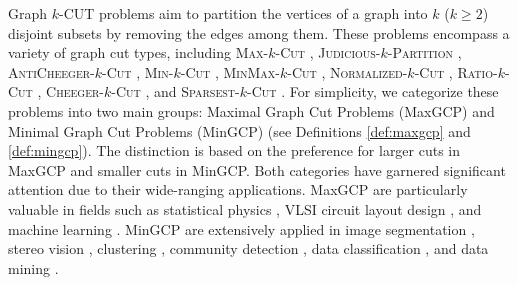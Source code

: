 \documentclass[12pt, a4paper]{article}%
\numberwithin{equation}{section}
\theoremstyle{plain}
\begin{document}
	Graph $k$-CUT problems aim to partition the vertices of a graph into $k$ ($k \geq 2$) disjoint subsets by removing the edges among them. These problems encompass a variety of graph cut types, including \textsc{Max}-$k$-\textsc{Cut} \cite{kann1997hardness}, \textsc{Judicious}-$k$-\textsc{Partition} \cite{bollobas2002problems}, \textsc{AntiCheeger}-$k$-\textsc{Cut} \cite{xu2016graph}, \textsc{Min}-$k$-\textsc{Cut} \cite{goldschmidt1994polynomial}, \textsc{MinMax}-$k$-\textsc{Cut} \cite{chandrasekaran2023fixed}, \textsc{Normalized}-$k$-\textsc{Cut} \cite{shi2000normalized}, \textsc{Ratio}-$k$-\textsc{Cut} \cite{dhillon2007weighted}, \textsc{Cheeger}-$k$-\textsc{Cut} \cite{louis2012many}, and \textsc{Sparsest}-$k$-\textsc{Cut} \cite{arora2009expander,bresson2013multiclass}. For simplicity, we categorize these problems into two main groups: Maximal Graph Cut Problems (MaxGCP) and Minimal Graph Cut Problems (MinGCP) (see Definitions \ref{def:maxgcp} and \ref{def:mingcp}). The distinction is based on the preference for larger cuts in MaxGCP and smaller cuts in MinGCP. Both categories have garnered significant attention due to their wide-ranging applications. 	MaxGCP are particularly valuable in fields such as statistical physics \cite{barahona1988application, liers2004computing}, VLSI circuit layout design \cite{chang1987efficient, cho1998fast}, and machine learning \cite{jun2013semi}. MinGCP are extensively applied in image segmentation \cite{boykov2001interactive, estrada2005quantitative, boykov2006graph}, stereo vision \cite{buehler2002minimal, ishikawa1998occlusions}, clustering \cite{bresson2013multiclass, dhillon2004kernel, pei2020efficient}, community detection \cite{newman2013spectral, mu2019multi}, data classification \cite{merkurjev2017modified}, and data mining \cite{hochbaum2016sparse}.
	
\end{document}
